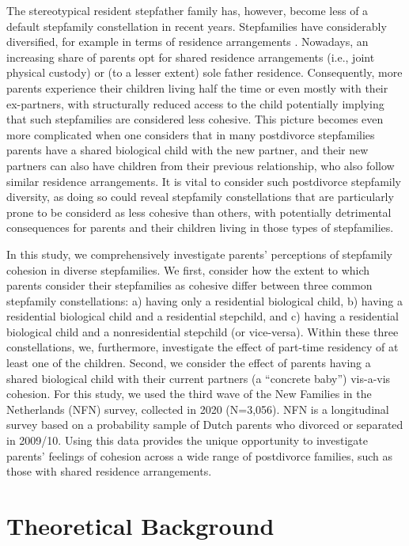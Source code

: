 \documentclass[\pandocDocMode,longtable,floatsintext]{apa6}
\begin{document}
The stereotypical resident stepfather family has, however, become less
of a default stepfamily constellation in recent years. Stepfamilies have
considerably diversified, for example in terms of residence arrangements
\autocite{raley_divorce_2020}. Nowadays, an increasing share of parents
opt for shared residence arrangements (i.e., joint physical custody) or
(to a lesser extent) sole father residence. Consequently, more parents
experience their children living half the time or even mostly with their
ex-partners, with structurally reduced access to the child potentially
implying that such stepfamilies are considered less cohesive. This
picture becomes even more complicated when one considers that in many
postdivorce stepfamilies parents have a shared biological child with the
new partner, and their new partners can also have children from their
previous relationship, who also follow similar residence arrangements.
It is vital to consider such postdivorce stepfamily diversity, as doing
so could reveal stepfamily constellations that are particularly prone to
be considerd as less cohesive than others, with potentially detrimental
consequences for parents and their children living in those types of
stepfamilies.

In this study, we comprehensively investigate parents' perceptions of
stepfamily cohesion in diverse stepfamilies. We first, consider how the
extent to which parents consider their stepfamilies as cohesive differ
between three common stepfamily constellations: a) having only a
residential biological child, b) having a residential biological child
and a residential stepchild, and c) having a residential biological
child and a nonresidential stepchild (or vice-versa). Within these three
constellations, we, furthermore, investigate the effect of part-time
residency of at least one of the children. Second, we consider the
effect of parents having a shared biological child with their current
partners (a ``concrete baby'') vis-a-vis cohesion. For this study, we
used the third wave of the New Families in the Netherlands (NFN) survey,
collected in 2020 (N=3,056). NFN is a longitudinal survey based on a
probability sample of Dutch parents who divorced or separated in
2009/10. Using this data provides the unique opportunity to investigate
parents' feelings of cohesion across a wide range of postdivorce
families, such as those with shared residence arrangements.

\hypertarget{theoretical-background}{%
\section{Theoretical Background}\label{theoretical-background}}
\end{document}
